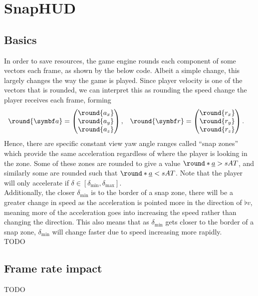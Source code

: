 \section{SnapHUD}
\label{sec:snaphud}

\subsection{Basics}
\label{sec:snap_basics}
In order to save resources, the game engine rounds each component of some vectors each frame, as shown by the below code. Albeit a simple change, this largely changes the way the game is played.
Since player velocity is one of the vectors that is rounded, we can interpret this as rounding the speed change the player receives each frame, forming
\begin{align*}
\round{\vec{a}} &=
\begin{pmatrix}
\round{a_x} \\ \round{a_y} \\ \round{a_z}
\end{pmatrix}, & \round{\vec{r}} &=
\begin{pmatrix}
\round{r_x} \\ \round{r_y} \\ \round{r_z}
\end{pmatrix}.
\end{align*}
Hence, there are specific constant view yaw angle ranges called ``snap zones'' which provide the same acceleration regardless of where the player is looking in the zone.
Some of these zones are rounded to give a value $\round*{\flat{a}} > sAT$, and similarly some are rounded such that $\round*{\flat{a}} < sAT$.
Note that the player will only accelerate if $\delta \in [\delta_{\min}, \delta_{\max}]$.\\
Additionally, the closer $\delta_{\min}$ is to the border of a snap zone, there will be a greater change in speed as the acceleration is pointed more in the direction of $\flat{v}$, meaning more of the acceleration goes into increasing the speed rather than changing the direction.
This also means that as $\delta_{\min}$ gets closer to the border of a snap zone, $\delta_{\min}$ will change faster due to speed increasing more rapidly.\\
TODO


\subsection{Frame rate impact}
\label{sec:snap_frame_rate}
TODO


